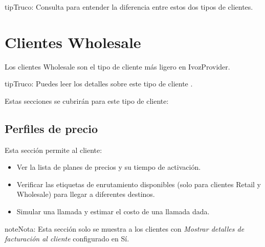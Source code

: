 \documentclass[letterpaper,10pt,spanish]{sphinxmanual}
\begin{document}
\begin{notice}{tip}{Truco:}
Consulta {\hyperref[administration_portal/brand/clients/retail:differences\string-between\string-retail\string-and\string-residential\string-clients]{}} para entender la diferencia entre estos dos tipos de clientes.
\end{notice}
\label{administration_portal/client/wholesale/index:wholesale-clients}

\section{Clientes Wholesale}
\label{administration_portal/client/wholesale/index:clientes-wholesale}\label{administration_portal/client/wholesale/index:wholesale-clients}\label{administration_portal/client/wholesale/index::doc}\label{administration_portal/client/wholesale/index:id1}
Los clientes Wholesale son el tipo de cliente más ligero en IvozProvider.

\begin{notice}{tip}{Truco:}
Puedes leer los detalles sobre este tipo de cliente {\hyperref[administration_portal/brand/clients/wholesale:wholesale\string-clients]{}}.
\end{notice}

Estas secciones se cubrirán para este tipo de cliente:


\subsection{Perfiles de precio}
\label{administration_portal/client/wholesale/rating_profiles:rating-profiles}\label{administration_portal/client/wholesale/rating_profiles::doc}
Esta sección permite al cliente:
\begin{itemize}
\item {} 
Ver la lista de planes de precios y su tiempo de activación.

\item {} 
Verificar las etiquetas de enrutamiento disponibles (solo para clientes Retail y Wholesale) para llegar a diferentes destinos.

\item {} 
Simular una llamada y estimar el costo de una llamada dada.

\end{itemize}

\begin{notice}{note}{Nota:}
Esta sección solo se muestra a los clientes con \emph{Mostrar detalles de facturación al cliente} configurado en Sí.
\end{notice}
\end{document}
